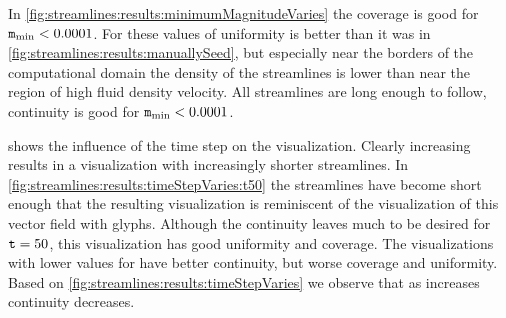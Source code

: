 In \cref{fig:streamlines:results:minimumMagnitudeVaries} the coverage is good for $\mathtt{m}_{\text{min}} < 0.0001$. For these values of \magnitudeMin uniformity is better than it was in \cref{fig:streamlines:results:manuallySeed}, but especially near the borders of the computational domain the density of the streamlines is lower than near the region of high fluid density velocity. All streamlines are long enough to follow, continuity is good for $\mathtt{m}_{\text{min}} < 0.0001$.

 shows the influence of the time step on the visualization. Clearly increasing \timeStep results in a visualization with increasingly shorter streamlines. In \cref{fig:streamlines:results:timeStepVaries:t50} the streamlines have become short enough that the resulting visualization is reminiscent of the visualization of this vector field with glyphs. Although the continuity leaves much to be desired for $\mathtt{t} = 50$, this visualization has good uniformity and coverage. The visualizations with lower values for \timeStep have better continuity, but worse coverage and uniformity. Based on \cref{fig:streamlines:results:timeStepVaries} we observe that as \timeStep increases continuity decreases. 

